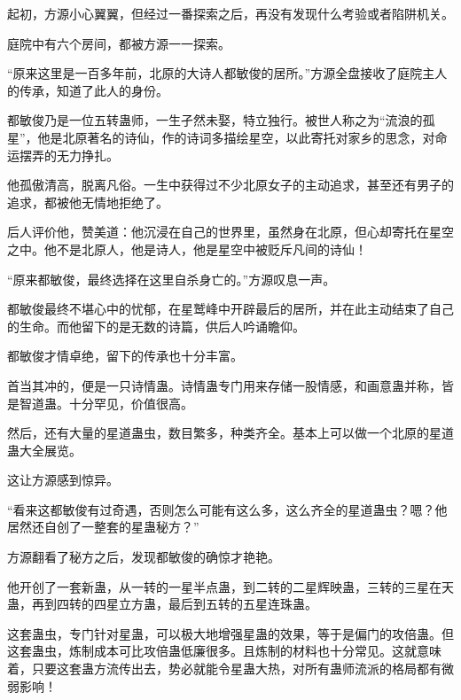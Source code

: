 \begin{this_body}
起初，方源小心翼翼，但经过一番探索之后，再没有发现什么考验或者陷阱机关。

庭院中有六个房间，都被方源一一探索。

“原来这里是一百多年前，北原的大诗人都敏俊的居所。”方源全盘接收了庭院主人的传承，知道了此人的身份。

都敏俊乃是一位五转蛊师，一生孑然未娶，特立独行。被世人称之为“流浪的孤星”，他是北原著名的诗仙，作的诗词多描绘星空，以此寄托对家乡的思念，对命运摆弄的无力挣扎。

他孤傲清高，脱离凡俗。一生中获得过不少北原女子的主动追求，甚至还有男子的追求，都被他无情地拒绝了。

后人评价他，赞美道：他沉浸在自己的世界里，虽然身在北原，但心却寄托在星空之中。他不是北原人，他是诗人，他是星空中被贬斥凡间的诗仙！

“原来都敏俊，最终选择在这里自杀身亡的。”方源叹息一声。

都敏俊最终不堪心中的忧郁，在星鹫峰中开辟最后的居所，并在此主动结束了自己的生命。而他留下的是无数的诗篇，供后人吟诵瞻仰。

都敏俊才情卓绝，留下的传承也十分丰富。

首当其冲的，便是一只诗情蛊。诗情蛊专门用来存储一股情感，和画意蛊并称，皆是智道蛊。十分罕见，价值很高。

然后，还有大量的星道蛊虫，数目繁多，种类齐全。基本上可以做一个北原的星道蛊大全展览。

这让方源感到惊异。

“看来这都敏俊有过奇遇，否则怎么可能有这么多，这么齐全的星道蛊虫？嗯？他居然还自创了一整套的星蛊秘方？”

方源翻看了秘方之后，发现都敏俊的确惊才艳艳。

他开创了一套新蛊，从一转的一星半点蛊，到二转的二星辉映蛊，三转的三星在天蛊，再到四转的四星立方蛊，最后到五转的五星连珠蛊。

这套蛊虫，专门针对星蛊，可以极大地增强星蛊的效果，等于是偏门的攻倍蛊。但这套蛊虫，炼制成本可比攻倍蛊低廉很多。且炼制的材料也十分常见。这就意味着，只要这套蛊方流传出去，势必就能令星蛊大热，对所有蛊师流派的格局都有微弱影响！

\end{this_body}

